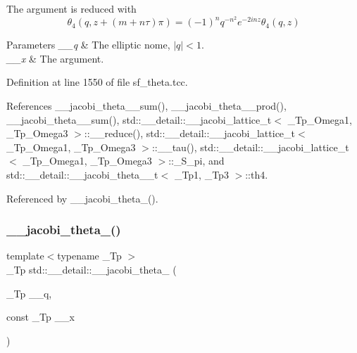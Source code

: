 The argument is reduced with \[ \theta_4(q, z+(m + n\tau)\pi) = (-1)^n q^{-n^2}e^{-2inz}\theta_4(q, z) \]


\begin{DoxyParams}{Parameters}
{\em \+\_\+\+\_\+q} & The elliptic nome, $ |q| < 1 $. \\
\hline
{\em \+\_\+\+\_\+x} & The argument. \\
\hline
\end{DoxyParams}


Definition at line 1550 of file sf\+\_\+theta.\+tcc.



References \+\_\+\+\_\+jacobi\+\_\+theta\+\_\+\_\+sum(), \+\_\+\+\_\+jacobi\+\_\+theta\+\_\+\_\+prod(), \+\_\+\+\_\+jacobi\+\_\+theta\+\_\+\_\+sum(), std\+::\+\_\+\+\_\+detail\+::\+\_\+\+\_\+jacobi\+\_\+lattice\+\_\+t$<$ \+\_\+\+Tp\+\_\+\+Omega1, \+\_\+\+Tp\+\_\+\+Omega3 $>$\+::\+\_\+\+\_\+reduce(), std\+::\+\_\+\+\_\+detail\+::\+\_\+\+\_\+jacobi\+\_\+lattice\+\_\+t$<$ \+\_\+\+Tp\+\_\+\+Omega1, \+\_\+\+Tp\+\_\+\+Omega3 $>$\+::\+\_\+\+\_\+tau(), std\+::\+\_\+\+\_\+detail\+::\+\_\+\+\_\+jacobi\+\_\+lattice\+\_\+t$<$ \+\_\+\+Tp\+\_\+\+Omega1, \+\_\+\+Tp\+\_\+\+Omega3 $>$\+::\+\_\+\+S\+\_\+pi, and std\+::\+\_\+\+\_\+detail\+::\+\_\+\+\_\+jacobi\+\_\+theta\+\_\+\_\+t$<$ \+\_\+\+Tp1, \+\_\+\+Tp3 $>$\+::th4.



Referenced by \+\_\+\+\_\+jacobi\+\_\+theta\+\_().

\mbox{\label{namespacestd_1_1____detail_a0e4199a4d77f33d27b09063b25c99b7f}} 
\subsubsection{\texorpdfstring{\+\_\+\+\_\+jacobi\+\_\+theta\+\_()}{\_\_jacobi\_theta\_4()}\hspace{0.1cm}{\footnotesize\ttfamily [2/2]}}
{\footnotesize\ttfamily template$<$typename \+\_\+\+Tp $>$ \\
\+\_\+\+Tp std\+::\+\_\+\+\_\+detail\+::\+\_\+\+\_\+jacobi\+\_\+theta\+\_ (\begin{DoxyParamCaption}\item[{\+\_\+\+Tp}]{\+\_\+\+\_\+q,  }\item[{const \+\_\+\+Tp}]{\+\_\+\+\_\+x }\end{DoxyParamCaption})}

